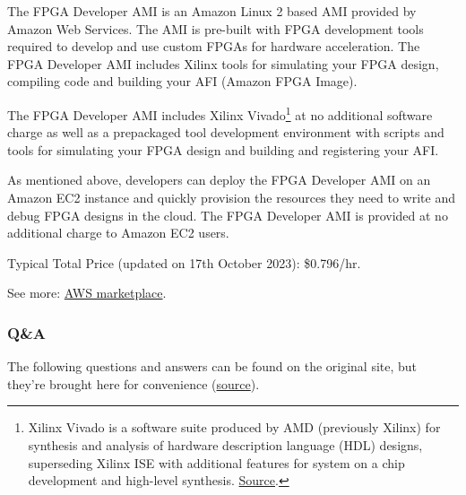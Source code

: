 \documentclass[a4paper]{article}
\begin{document}
    The FPGA Developer AMI is an Amazon Linux 2 based AMI provided by Amazon Web Services. The AMI is pre-built with FPGA development tools required to develop and use custom FPGAs for hardware acceleration. The FPGA Developer AMI includes Xilinx tools for simulating your FPGA design, compiling code and building your AFI (Amazon FPGA Image).\newline

    \noindent
    The FPGA Developer AMI includes Xilinx Vivado\footnote{Xilinx Vivado is a software suite produced by AMD (previously Xilinx) for synthesis and analysis of hardware description language (HDL) designs, superseding Xilinx ISE with additional features for system on a chip development and high-level synthesis. \href{https://en.wikipedia.org/wiki/Vivado}{Source}.} at no additional software charge as well as a prepackaged tool development environment with scripts and tools for simulating your FPGA design and building and registering your AFI.\newline

    \noindent
    As mentioned above, developers can deploy the FPGA Developer AMI on an Amazon EC2 instance and quickly provision the resources they need to write and debug FPGA designs in the cloud. The FPGA Developer AMI is provided at no additional charge to Amazon EC2 users.\newline

    \noindent
    Typical Total Price (updated on 17th October 2023): \$0.796/hr.\newline

    \noindent
    See more: \href{https://aws.amazon.com/marketplace/pp/prodview-iehshpgi7hcjg}{AWS marketplace}.\newpage
    
    \subsubsection{Q\&A}
    
    The following questions and answers can be found on the original site, but they're brought here for convenience (\href{https://aws.amazon.com/ec2/faqs/?nc1=h_ls#Instance_types}{source}).
\end{document}
